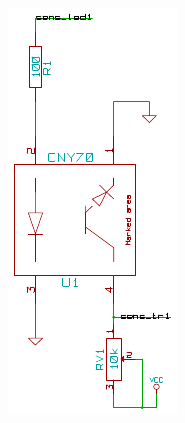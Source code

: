 \documentclass[compress]{beamer}
\begin{document}
\begin{frame}[fragile]
\begin{columns}
\begin{center}
 \includegraphics[width=0.8\columnwidth]{./img/sensor.pdf}
\end{center}
\end{columns}
\end{frame}
\end{document}
